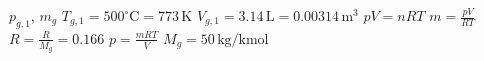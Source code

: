 \( p_{g,1} \), \( m_g \)  
\( T_{g,1} = 500^\circ \text{C} = 773 \, \text{K} \)  
\( V_{g,1} = 3.14 \, \text{L} = 0.00314 \, \text{m}^3 \)  
\( pV = nRT \)  
\( m = \frac{pV}{RT} \)  
\( R = \frac{R}{M_g} = 0.166 \)  
\( p = \frac{mRT}{V} \)  
\( M_g = 50 \, \text{kg/kmol} \)